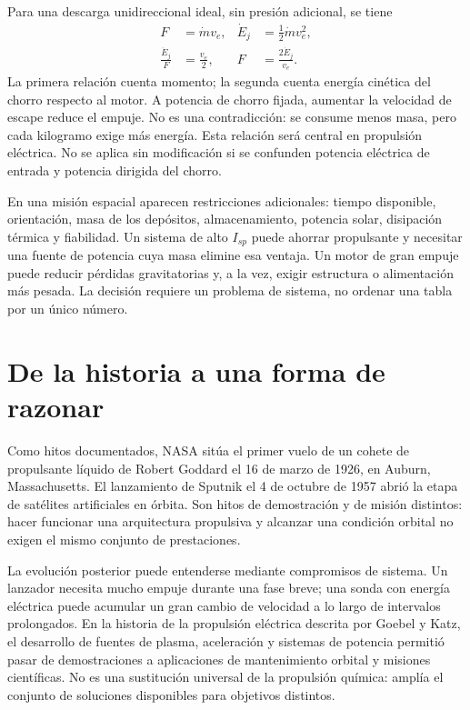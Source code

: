 Para una descarga unidireccional ideal, sin presión adicional, se tiene
\begin{align}
 F&=\dot m v_e, & \dot E_j&=\frac12\dot m v_e^2,\\
 \frac{\dot E_j}{F}&=\frac{v_e}{2}, & F&=\frac{2\dot E_j}{v_e}.
\end{align}
La primera relación cuenta momento; la segunda cuenta energía cinética del chorro respecto al motor. A potencia de chorro fijada, aumentar la velocidad de escape reduce el empuje. No es una contradicción: se consume menos masa, pero cada kilogramo exige más energía. Esta relación será central en propulsión eléctrica. No se aplica sin modificación si se confunden potencia eléctrica de entrada y potencia dirigida del chorro.

En una misión espacial aparecen restricciones adicionales: tiempo disponible, orientación, masa de los depósitos, almacenamiento, potencia solar, disipación térmica y fiabilidad. Un sistema de alto $I_{sp}$ puede ahorrar propulsante y necesitar una fuente de potencia cuya masa elimine esa ventaja. Un motor de gran empuje puede reducir pérdidas gravitatorias y, a la vez, exigir estructura o alimentación más pesada. La decisión requiere un problema de sistema, no ordenar una tabla por un único número.
\section{De la historia a una forma de razonar}
Como hitos documentados, NASA sitúa el primer vuelo de un cohete de propulsante líquido de Robert Goddard el 16 de marzo de 1926, en Auburn, Massachusetts. El lanzamiento de Sputnik el 4 de octubre de 1957 abrió la etapa de satélites artificiales en órbita. Son hitos de demostración y de misión distintos: hacer funcionar una arquitectura propulsiva y alcanzar una condición orbital no exigen el mismo conjunto de prestaciones.\cite{NASA-GODDARD,NASA-SPUTNIK}

La evolución posterior puede entenderse mediante compromisos de sistema. Un lanzador necesita mucho empuje durante una fase breve; una sonda con energía eléctrica puede acumular un gran cambio de velocidad a lo largo de intervalos prolongados. En la historia de la propulsión eléctrica descrita por Goebel y Katz, el desarrollo de fuentes de plasma, aceleración y sistemas de potencia permitió pasar de demostraciones a aplicaciones de mantenimiento orbital y misiones científicas. No es una sustitución universal de la propulsión química: amplía el conjunto de soluciones disponibles para objetivos distintos.

